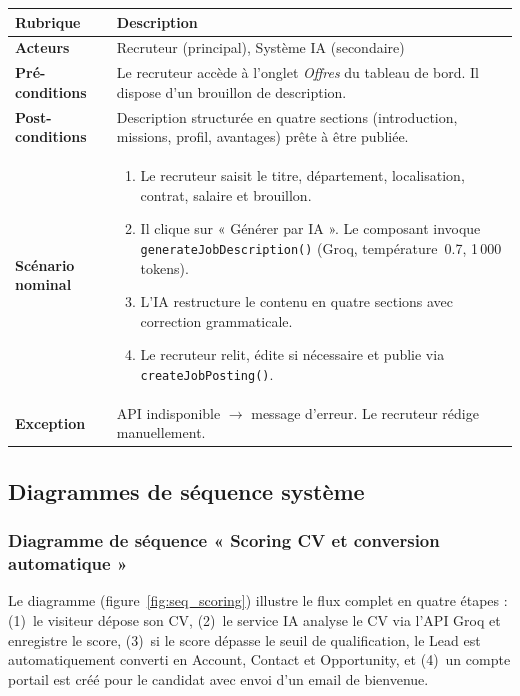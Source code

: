\begin{longtable}{|p{4cm}|p{10.5cm}|}
\hline
\rowcolor{gray!15} \textbf{Rubrique} & \textbf{Description} \\
\hline
\endfirsthead
\endhead

\textbf{Acteurs} & Recruteur (principal), Système IA (secondaire) \\
\hline
\textbf{Pré-conditions} & Le recruteur accède à l'onglet \textit{Offres} du tableau de bord. Il dispose d'un brouillon de description. \\
\hline
\textbf{Post-conditions} & Description structurée en quatre sections (introduction, missions, profil, avantages) prête à être publiée. \\
\hline
\textbf{Scénario nominal} &
\begin{enumerate}[nosep,leftmargin=*]
    \item Le recruteur saisit le titre, département, localisation, contrat, salaire et brouillon.
    \item Il clique sur « Générer par IA ». Le composant invoque \texttt{generateJobDescription()} (Groq, température~0.7, 1\,000 tokens).
    \item L'IA restructure le contenu en quatre sections avec correction grammaticale.
    \item Le recruteur relit, édite si nécessaire et publie via \texttt{createJobPosting()}.
\end{enumerate} \\
\hline
\textbf{Exception} & API indisponible $\rightarrow$ message d'erreur. Le recruteur rédige manuellement. \\
\hline
\end{longtable}
\FloatBarrier

\subsection{Diagrammes de séquence système}

\subsubsection{Diagramme de séquence « Scoring CV et conversion automatique »}

Le diagramme (figure~\ref{fig:seq_scoring}) illustre le flux complet en quatre étapes : (1)~le visiteur dépose son CV, (2)~le service IA analyse le CV via l'API Groq et enregistre le score, (3)~si le score dépasse le seuil de qualification, le Lead est automatiquement converti en Account, Contact et Opportunity, et (4)~un compte portail est créé pour le candidat avec envoi d'un email de bienvenue.

